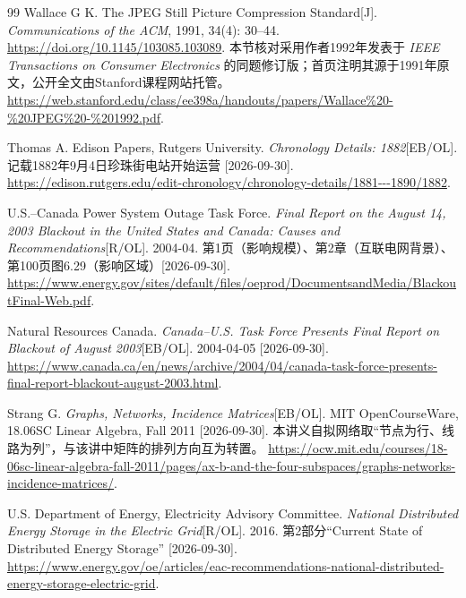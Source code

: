 \documentclass[a4paper,12pt,twoside,openany,fontset=none]{ctexbook}
\numberwithin{equation}{chapter}
\begin{document}
\begin{thebibliography}{99}
Wallace G K. The JPEG Still Picture Compression Standard[J]. \textit{Communications of the ACM}, 1991, 34(4): 30--44.
\newblock \url{https://doi.org/10.1145/103085.103089}.
\newblock 本节核对采用作者1992年发表于 \textit{IEEE Transactions on Consumer Electronics} 的同题修订版；首页注明其源于1991年原文，公开全文由Stanford课程网站托管。
\newblock \url{https://web.stanford.edu/class/ee398a/handouts/papers/Wallace%20-%20JPEG%20-%201992.pdf}.

Thomas A. Edison Papers, Rutgers University. \textit{Chronology Details: 1882}[EB/OL]. 记载1882年9月4日珍珠街电站开始运营 [2026-09-30].
\newblock \url{https://edison.rutgers.edu/edit-chronology/chronology-details/1881---1890/1882}.

U.S.--Canada Power System Outage Task Force. \textit{Final Report on the August 14, 2003 Blackout in the United States and Canada: Causes and Recommendations}[R/OL]. 2004-04. 第1页（影响规模）、第2章（互联电网背景）、第100页图6.29（影响区域）[2026-09-30].
\newblock \url{https://www.energy.gov/sites/default/files/oeprod/DocumentsandMedia/BlackoutFinal-Web.pdf}.

Natural Resources Canada. \textit{Canada--U.S. Task Force Presents Final Report on Blackout of August 2003}[EB/OL]. 2004-04-05 [2026-09-30].
\newblock \url{https://www.canada.ca/en/news/archive/2004/04/canada-task-force-presents-final-report-blackout-august-2003.html}.

Strang G. \textit{Graphs, Networks, Incidence Matrices}[EB/OL]. MIT OpenCourseWare, 18.06SC Linear Algebra, Fall 2011 [2026-09-30]. 本讲义自拟网络取“节点为行、线路为列”，与该讲中矩阵的排列方向互为转置。
\newblock \url{https://ocw.mit.edu/courses/18-06sc-linear-algebra-fall-2011/pages/ax-b-and-the-four-subspaces/graphs-networks-incidence-matrices/}.

U.S. Department of Energy, Electricity Advisory Committee. \textit{National Distributed Energy Storage in the Electric Grid}[R/OL]. 2016. 第2部分“Current State of Distributed Energy Storage” [2026-09-30].
\newblock \url{https://www.energy.gov/oe/articles/eac-recommendations-national-distributed-energy-storage-electric-grid}.

\end{thebibliography}
\par\clearpage
\endgroup
\end{document}
